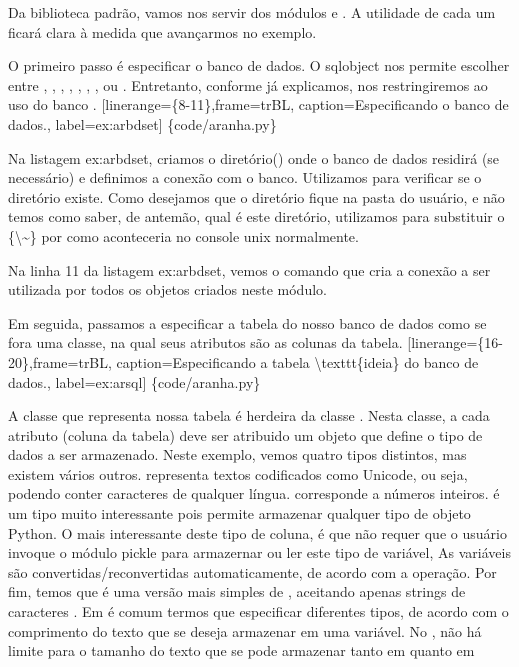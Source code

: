 \documentclass[a4paper,10pt,brazil]{sphinxmanual}
\begin{document}
Da biblioteca padrão, vamos nos servir dos módulos
 e . A utilidade de cada um
ficará clara à medida que avançarmos no exemplo.

O primeiro passo é especificar o banco de dados. O sqlobject nos
permite escolher entre , , ,
, , , , ou .
Entretanto, conforme já explicamos, nos restringiremos ao uso do
banco .
{[}linerange=\{8-11\},frame=trBL, caption=Especificando o banco de dados., label=ex:arbdset{]} \{code/aranha.py\}

Na listagem ex:arbdset, criamos o diretório() onde o
banco de dados residirá (se necessário) e definimos a conexão com o
banco. Utilizamos  para verificar se o diretório
existe. Como desejamos que o diretório fique na pasta do usuário, e
não temos como saber, de antemão, qual é este diretório, utilizamos
 para substituir o \{\textbackslash{}\textasciitilde{}\} por
 como aconteceria no console unix normalmente.

Na linha 11 da listagem ex:arbdset, vemos o comando que cria a
conexão a ser utilizada por todos os objetos criados neste módulo.

Em seguida, passamos a especificar a tabela do nosso banco de dados
como se fora uma classe, na qual seus atributos são as colunas da
tabela.
{[}linerange=\{16-20\},frame=trBL, caption=Especificando a tabela \textbackslash{}texttt\{ideia\} do banco de dados., label=ex:arsql{]} \{code/aranha.py\}

A classe que representa nossa tabela é herdeira da classe
. Nesta classe, a cada atributo (coluna da tabela)
deve ser atribuido um objeto que define o tipo de dados a ser
armazenado. Neste exemplo, vemos quatro tipos distintos, mas
existem vários outros.  representa textos codificados
como Unicode, ou seja, podendo conter caracteres de qualquer
língua.  corresponde a números inteiros.  é
um tipo muito interessante pois permite armazenar qualquer tipo de
objeto Python. O mais interessante deste tipo de coluna, é que não
requer que o usuário invoque o módulo pickle para armazernar ou ler
este tipo de variável, As variáveis são convertidas/reconvertidas
automaticamente, de acordo com a operação. Por fim, temos
 que é uma versão mais simples de ,
aceitando apenas strings de caracteres . Em  é
comum termos que especificar diferentes tipos, de acordo com o
comprimento do texto que se deseja armazenar em uma variável. No
, não há limite para o tamanho do texto que se pode
armazenar tanto em  quanto em 
\end{document}
